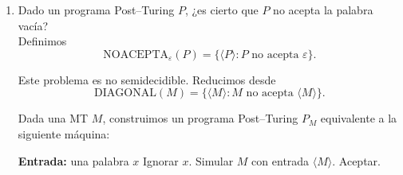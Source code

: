 \documentclass[12pt]{article}
\begin{document}
\begin{ejercicio}[2 puntos]
\begin{enumerate}
            \begin{algorithm}
            \caption{MT $M_{POL}$}
            \begin{algorithmic}
            \State \textbf{Entrada:} una palabra $x \in \{0,1\}^{*}$
            \State Simular $M$ con entrada $\langle M\rangle$.
                \State Simular una MT fija $M'$ tal que $L(M')=L_u$ con entrada $x$.
                    \State Aceptar.
                \EndIf
            \EndIf
            \end{algorithmic}
            \end{algorithm}

            Si $\langle M\rangle \in \text{DIAGONAL}$, entonces $M$ no acepta $\langle M\rangle$, luego $L(M_{POL})=\emptyset \in \mathbf{P}$.

            Si $\langle M\rangle \notin \text{DIAGONAL}$, entonces $M$ acepta $\langle M\rangle$, luego 
            $M_{POL}$ se comporta como $M'$ sobre toda entrada $x$, y por tanto $L(M_{POL})=L(M')=L_u$, que no es decidible y por tanto no pertenece a $\mathbf{P}$.

            Así,
            $$
            \langle M\rangle \in \text{DIAGONAL}
            \Longleftrightarrow
            \langle M_{POL}\rangle \in \text{POL}.
            $$

            Como $\text{DIAGONAL} \propto \text{POL}$ y DIAGONAL no es semidecidible, $\text{POL}$ tampoco es semidecidible. Por tanto, el problema es no semidecidible y, en particular, no decidible.

            \newpage

            \item Dado un programa Post--Turing $P$, ¿es cierto que $P$ no acepta la palabra vacía? \\
            
            Definimos
            $$
            \text{NOACEPTA}_{\varepsilon}(P)=\{\langle P\rangle : P \text{ no acepta } \varepsilon\}.
            $$

            Este problema es no semidecidible. Reducimos desde
            $$
            \text{DIAGONAL}(M)=\{\langle M\rangle : M \text{ no acepta } \langle M\rangle\}.
            $$

            Dada una MT $M$, construimos un programa Post--Turing $P_M$ equivalente a la siguiente máquina:

            \begin{algorithm}
            \caption{Programa $P_M$}
            \begin{algorithmic}
            \State \textbf{Entrada:} una palabra $x$
            \State Ignorar $x$.
            \State Simular $M$ con entrada $\langle M\rangle$.
                \State Aceptar.
            \EndIf
            \end{algorithmic}
            \end{algorithm}


\end{enumerate}
\end{ejercicio}
\end{document}
